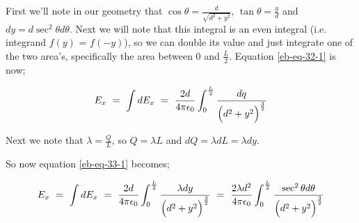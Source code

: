 \documentclass{article}
\begin{document}
First we'll note in our geometry that \begin{math} \cos{\theta} = \frac{d}{\sqrt{d^2 + y^2}} \end{math}, \begin{math} \tan{\theta} = \frac{y}{d} \end{math} and \begin{math} dy = d\sec^{2}{\theta}d\theta \end{math}. Next we will note that this integral is an even integral (i.e. integrand \begin{math} f(y) \end{math} = \begin{math} f(-y) \end{math}), so we can double its value and just integrate one of the two area's, specifically the area between \begin{math} 0 \end{math} and \begin{math} \frac{L}{2} \end{math}. Equation \ref{eb-eq-32-1} is now;

\begin{equation} \label{eb-eq-33-1}
E_x \hspace{0.125cm} = \hspace{0.125cm} \int dE_{x} \hspace{0.125cm} = \hspace{0.125cm} \frac{2d}{4\pi \epsilon_{0}} \int_{0}^{\frac{L}{2}} \frac{dq}{ \Big( d^2 + y^2 \Big)^{\frac{3}{2}}}
\end{equation}

Next we note that \begin{math} \lambda = \frac{Q}{L} \end{math}, so \begin{math} Q = \lambda L \end{math} and \begin{math} dQ = \lambda dL = \lambda dy \end{math}. 

So now equation \ref{eb-eq-33-1} becomes;

\begin{equation} \label{eb-eq-34-1}
E_x \hspace{0.125cm} = \hspace{0.125cm} \int dE_{x} \hspace{0.125cm} = \hspace{0.125cm} \frac{2d}{4\pi \epsilon_{0}} \int_{0}^{\frac{L}{2}} \frac{\lambda dy}{ \Big( d^2 + y^2 \Big)^{\frac{3}{2}}}  \hspace{0.125cm} = \hspace{0.125cm} \frac{2\lambda d^{2}}{4\pi \epsilon_{0}} \int_{0}^{\frac{L}{2}} \frac{\sec^{2}{\theta}d\theta{}}{ \Big( d^2 + y^2 \Big)^{\frac{3}{2}}}
\end{equation}
\end{document}
